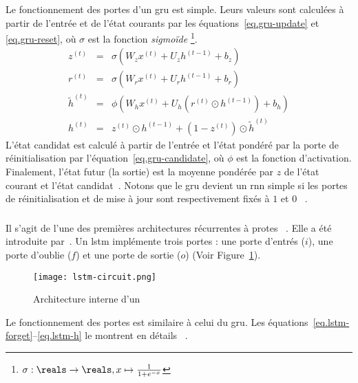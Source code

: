 Le fonctionnement des portes d'un \gls{gru} est simple.
Leurs valeurs sont calculées à partir de l'entrée et de l'état courants par
les équations~\ref{eq.gru-update} et \ref{eq.gru-reset}, 
où \(\sigma\) est la fonction \emph{sigmoïde}%
\footnote{\(\sigma:\reals\to\reals, x\mapsto\frac{1}{1+e^{-x}}\)}.
\begin{eqnarray}
    \label{eq.gru-update}
    z^{(t)}  &=&\sigma\left(W_z x^{(t)}+U_z h^{(t-1)}+b_z\right) \\
    \label{eq.gru-reset}
    r^{(t)}  &=&\sigma\left(W_r x^{(t)}+U_r h^{(t-1)}+b_r\right) \\
    \label{eq.gru-candidate}
    \tilde{h}^{(t)}  &=&\phi\left(W_h x^{(t)}+U_h\left(r^{(t)} \odot h^{(t-1)}\right)+b_h\right) \\
    \label{eq.gru-out}
    h^{(t)}  &=&z^{(t)} \odot h^{(t-1)}+\left(1-z^{(t)}\right) \odot \tilde{h}^{(t)}
\end{eqnarray}
L'état candidat est calculé à partir de l'entrée et l'état pondéré par la porte de réinitialisation
par l'équation~\ref{eq.gru-candidate}, où \(\phi\) est la fonction d'activation.
Finalement, l'état futur (la sortie) est la moyenne pondérée par \(z\) 
de l'état courant et l'état candidat~\cite{Cho_van_Merrienboer_Bahdanau_Bengio_2014}.
Notons que le \gls{gru} devient un \gls{rnn} simple 
si les portes de réinitialisation et de mise à jour sont respectivement fixés à \(1\) et \(0\)%
~\cite{Fathi_2021}.

\subsubsection{}

Il s'agit de l'une des premières architectures récurrentes à protes%
~\cite{Chung_Gulcehre_Cho_Bengio_2014}.
Elle a été introduite par~\cite{Hochreiter_Schmidhuber_1997}.
Un \gls{lstm} implémente trois portes : 
une porte d'entrés (\(i\)), une porte d'oublie (\(f\)) et une porte de sortie (\(o\))%
(Voir Figure~\ref{fig.lstm-circuit}).

\begin{figure}[htb]
    \begin{center}
        \texttt{[image: lstm-circuit.png]}
    \end{center}
    \caption{Architecture interne d'un ~\cite[Fig. 1a]{Chung_Gulcehre_Cho_Bengio_2014}}
    \label{fig.lstm-circuit}
\end{figure}

Le fonctionnement des portes est similaire à celui du \gls{gru}.
Les équations~\ref{eq.lstm-forget}--\ref{eq.lstm-h} le montrent en détails%
~\cite{Hochreiter_Schmidhuber_1997}.

